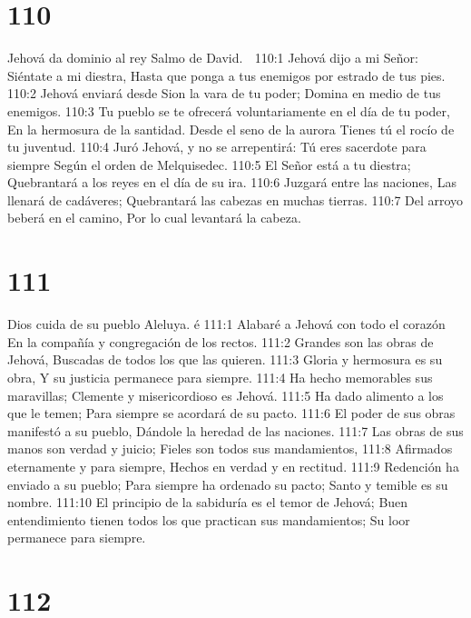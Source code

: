 \chapter{110}

Jehová da dominio al rey 
Salmo de David. 

110:1 Jehová dijo a mi Señor: 
Siéntate a mi diestra, 
Hasta que ponga a tus enemigos por estrado de tus pies. 
110:2 Jehová enviará desde Sion la vara de tu poder; 
Domina en medio de tus enemigos. 
110:3 Tu pueblo se te ofrecerá voluntariamente en el día de tu poder, 
En la hermosura de la santidad. 
Desde el seno de la aurora 
Tienes tú el rocío de tu juventud. 
110:4 Juró Jehová, y no se arrepentirá: 
Tú eres sacerdote para siempre 
Según el orden de Melquisedec. 
110:5 El Señor está a tu diestra; 
Quebrantará a los reyes en el día de su ira. 
110:6 Juzgará entre las naciones, 
Las llenará de cadáveres; 
Quebrantará las cabezas en muchas tierras. 
110:7 Del arroyo beberá en el camino, 
Por lo cual levantará la cabeza. 

\chapter{111}

Dios cuida de su pueblo 
Aleluya. 
é
111:1 Alabaré a Jehová con todo el corazón 
En la compañía y congregación de los rectos. 
111:2 Grandes son las obras de Jehová, 
Buscadas de todos los que las quieren. 
111:3 Gloria y hermosura es su obra, 
Y su justicia permanece para siempre. 
111:4 Ha hecho memorables sus maravillas; 
Clemente y misericordioso es Jehová. 
111:5 Ha dado alimento a los que le temen; 
Para siempre se acordará de su pacto. 
111:6 El poder de sus obras manifestó a su pueblo, 
Dándole la heredad de las naciones. 
111:7 Las obras de sus manos son verdad y juicio; 
Fieles son todos sus mandamientos, 
111:8 Afirmados eternamente y para siempre, 
Hechos en verdad y en rectitud. 
111:9 Redención ha enviado a su pueblo; 
Para siempre ha ordenado su pacto; 
Santo y temible es su nombre. 
111:10 El principio de la sabiduría es el temor de Jehová; 
Buen entendimiento tienen todos los 
que practican sus mandamientos; 
Su loor permanece para siempre. 

\chapter{112}

